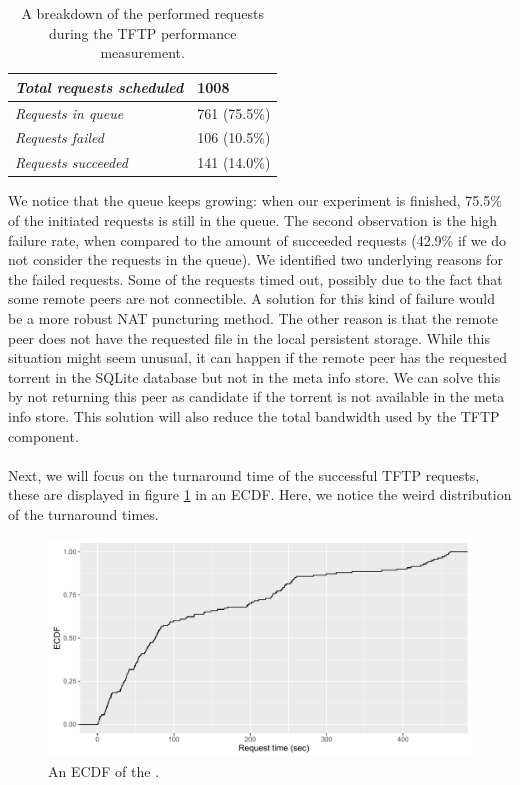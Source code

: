 \begin{table}[h!]
	\centering
	\begin{tabular}{|l|l|}
		\hline
		\emph{Total requests scheduled} & 1008 \\ \hline
		\emph{Requests in queue} & 761 (75.5\%)\\ \hline
		\emph{Requests failed} & 106 (10.5\%)\\ \hline
		\emph{Requests succeeded} & 141 (14.0\%)\\ \hline
	\end{tabular}
	\caption{A breakdown of the performed requests during the TFTP performance measurement.}
	\label{table:tftp-performance}
\end{table}

We notice that the queue keeps growing: when our experiment is finished, 75.5\% of the initiated requests is still in the queue. The second observation is the high failure rate, when compared to the amount of succeeded requests (42.9\% if we do not consider the requests in the queue). We identified two underlying reasons for the failed requests. Some of the requests timed out, possibly due to the fact that some remote peers are not connectible. A solution for this kind of failure would be a more robust NAT puncturing method. The other reason is that the remote peer does not have the requested file in the local persistent storage. While this situation might seem unusual, it can happen if the remote peer has the requested torrent in the SQLite database but not in the meta info store. We can solve this by not returning this peer as candidate if the torrent is not available in the meta info store. This solution will also reduce the total bandwidth used by the TFTP component.\\\\
Next, we will focus on the turnaround time of the successful TFTP requests, these are displayed in figure \ref{fig:tftp_performance} in an ECDF. Here, we notice the weird distribution of the turnaround times.

\begin{figure}[!h]
	\centering
	\includegraphics[width=0.9\columnwidth]{images/experiments/tftp_performance}
	\caption{An ECDF of the .}
	\label{fig:tftp_performance}
\end{figure}

